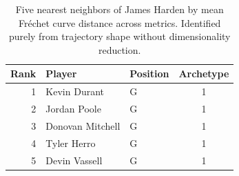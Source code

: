 \begin{table}[htbp]
  \centering\small
  \begin{tabular}{rllc}
    \toprule
    Rank & Player & Position & Archetype \\
    \midrule
    1 & Kevin Durant & G & 1 \\
    2 & Jordan Poole & G & 1 \\
    3 & Donovan Mitchell & G & 1 \\
    4 & Tyler Herro & G & 1 \\
    5 & Devin Vassell & G & 1 \\
    \bottomrule
  \end{tabular}
  \caption{Five nearest neighbors of James Harden by mean Fr\'{e}chet curve distance across metrics. Identified purely from trajectory shape without dimensionality reduction.}
  \label{tab:James_Harden_frechet_curve_neighbors}
\end{table}

